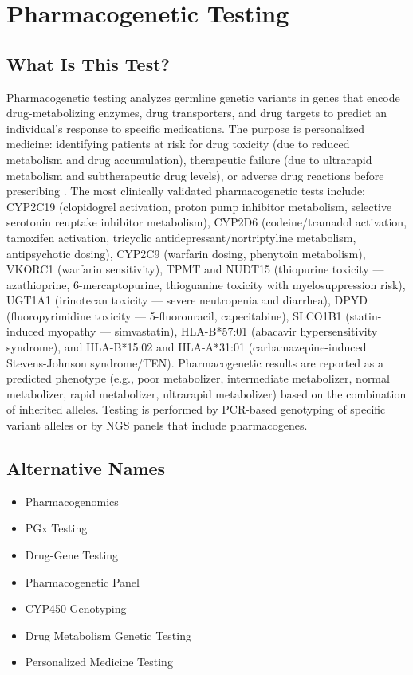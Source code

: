 \chapter{Pharmacogenetic Testing}

\section*{What Is This Test?}
Pharmacogenetic testing analyzes germline genetic variants in genes that encode drug-metabolizing enzymes, drug transporters, and drug targets to predict an individual's response to specific medications. The purpose is personalized medicine: identifying patients at risk for drug toxicity (due to reduced metabolism and drug accumulation), therapeutic failure (due to ultrarapid metabolism and subtherapeutic drug levels), or adverse drug reactions before prescribing \cite{relling2015pharmacogenomics}. The most clinically validated pharmacogenetic tests include: CYP2C19 (clopidogrel activation, proton pump inhibitor metabolism, selective serotonin reuptake inhibitor metabolism), CYP2D6 (codeine/tramadol activation, tamoxifen activation, tricyclic antidepressant/nortriptyline metabolism, antipsychotic dosing), CYP2C9 (warfarin dosing, phenytoin metabolism), VKORC1 (warfarin sensitivity), TPMT and NUDT15 (thiopurine toxicity --- azathioprine, 6-mercaptopurine, thioguanine toxicity with myelosuppression risk), UGT1A1 (irinotecan toxicity --- severe neutropenia and diarrhea), DPYD (fluoropyrimidine toxicity --- 5-fluorouracil, capecitabine), SLCO1B1 (statin-induced myopathy --- simvastatin), HLA-B*57:01 (abacavir hypersensitivity syndrome), and HLA-B*15:02 and HLA-A*31:01 (carbamazepine-induced Stevens-Johnson syndrome/TEN). Pharmacogenetic results are reported as a predicted phenotype (e.g., poor metabolizer, intermediate metabolizer, normal metabolizer, rapid metabolizer, ultrarapid metabolizer) based on the combination of inherited alleles. Testing is performed by PCR-based genotyping of specific variant alleles or by NGS panels that include pharmacogenes.

\section*{Alternative Names}
\begin{itemize}
  \item Pharmacogenomics
  \item PGx Testing
  \item Drug-Gene Testing
  \item Pharmacogenetic Panel
  \item CYP450 Genotyping
  \item Drug Metabolism Genetic Testing
  \item Personalized Medicine Testing
\end{itemize}
